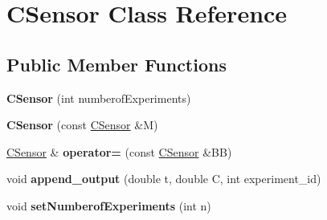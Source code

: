 \hypertarget{class_c_sensor}{}\section{C\+Sensor Class Reference}
\label{class_c_sensor}
\subsection*{Public Member Functions}
\begin{DoxyCompactItemize}
\item 
\mbox{\label{class_c_sensor_aec20dc80201231fbef4cdae4171bd068}} 
{\bfseries C\+Sensor} (int numberof\+Experiments)
\item 
\mbox{\label{class_c_sensor_af9adcd48df551e31a70e19c3a971c3fa}} 
{\bfseries C\+Sensor} (const \hyperlink{class_c_sensor}{C\+Sensor} \&M)
\item 
\mbox{\label{class_c_sensor_a50e5095e3c9833b538d030cde9a5fa1d}} 
\hyperlink{class_c_sensor}{C\+Sensor} \& {\bfseries operator=} (const \hyperlink{class_c_sensor}{C\+Sensor} \&BB)
\item 
\mbox{\label{class_c_sensor_aa73394b5c7ed1920c06407b565c47fd5}} 
void {\bfseries append\+\_\+output} (double t, double C, int experiment\+\_\+id)
\item 
\mbox{\label{class_c_sensor_a31c2e6a589c334b2e2a0f89c9addbe59}} 
void {\bfseries set\+Numberof\+Experiments} (int n)
\end{DoxyCompactItemize}
